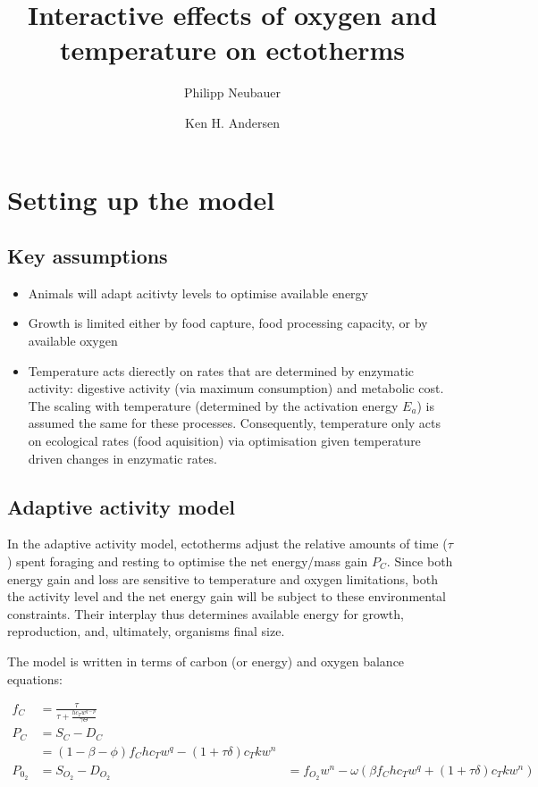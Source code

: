 \documentclass{article}
\title{Interactive effects of oxygen and temperature on ectotherms}
\author{Philipp Neubauer \and Ken H. Andersen}
\begin{document}
\maketitle

\section{Setting up the model}

\subsection{Key assumptions}
\begin{itemize}
\item Animals will adapt acitivty levels to optimise available energy
\item Growth is limited either by food capture, food processing capacity, or by available oxygen
\item Temperature acts dierectly on rates that are determined by enzymatic activity: digestive activity (via maximum consumption) and metabolic cost. The scaling with temperature (determined by the activation energy $E_a$) is assumed the same for these processes. Consequently, temperature only acts on ecological rates (food aquisition) via optimisation given temperature driven changes in enzymatic rates.


\end{itemize}

\subsection{Adaptive activity model}

In the adaptive activity model, ectotherms adjust the relative amounts of time ($\tau$) spent foraging and resting to optimise the net energy/mass gain $P_C$. Since both energy gain and loss are sensitive to temperature and oxygen limitations, both the activity level and the net energy gain will be subject to these environmental constraints. Their interplay thus determines available energy for growth, reproduction, and, ultimately, organisms final size.

The model is written in terms of carbon (or energy) and oxygen balance equations:

\begin{align}
f_C &= \frac{\tau }{\tau  + \frac{h c_T w^{q-p}}{\gamma\Theta} } \\
P_C &= S_C - D_C \\
  &=(1-\beta-\phi)f_C h c_T w^q  -(1+\tau \delta)c_T k w^n \\ 
P_{0_2} &= S_{O_2} - D_{O_2}
        &= f_{O_2}w^n - \omega(\beta f_C h c_T w^q +(1+\tau \delta) c_T k w^n) \\
\end{align}
\end{document}
